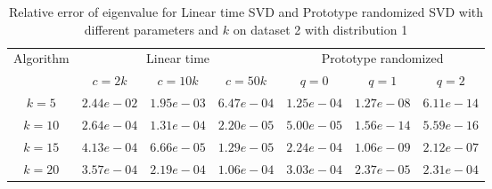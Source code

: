 \begin{table}\label{sigma21}
\centering
\begin{tabular}{|c|c|c|c|c|c|c|}

\hline
\multirow{2}{*}{ Algorithm} &\multicolumn{3}{c|}{Linear time} &\multicolumn{3}{c|}{Prototype randomized}\\\cline{2-7}
 &$c=2k$ &$c=10k$ &$c=50k$ &$q=0$ &$q=1$ &$q=2$\\\hline
$k=5$ & $2.44e-02$ & $1.95e-03$ & $6.47e-04$ & $1.25e-04$ & $1.27e-08$ & $6.11e-14$\\\hline
$k=10$ & $2.64e-04$ & $1.31e-04$ & $2.20e-05$ & $5.00e-05$ & $1.56e-14$ & $5.59e-16$\\\hline
$k=15$ & $4.13e-04$ & $6.66e-05$ & $1.29e-05$ & $2.24e-04$ & $1.06e-09$ & $2.12e-07$\\\hline
$k=20$ & $3.57e-04$ & $2.19e-04$ & $1.06e-04$ & $3.03e-04$ & $2.37e-05$ & $2.31e-04$\\\hline
\end{tabular}
\caption{Relative error of eigenvalue for Linear time SVD and Prototype randomized SVD with different parameters and $k$ on dataset 2 with distribution 1}
\end{table}
